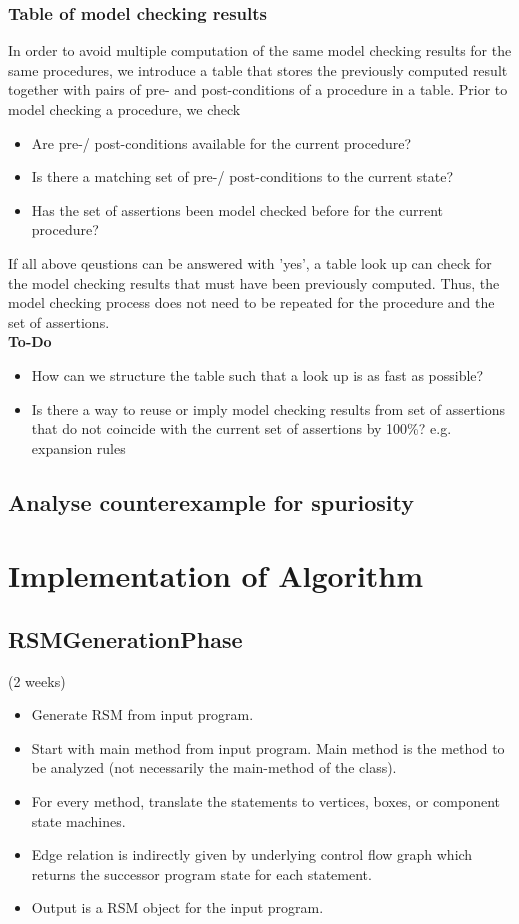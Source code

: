 \documentclass[a4paper,12pt]{article}
\begin{document}
\subsubsection{Table of model checking results}
In order to avoid multiple computation of the same model checking results for the same procedures, we introduce a table that stores the previously computed result together with pairs of pre- and post-conditions of a procedure in a table. Prior to model checking a procedure, we check
\begin{itemize}
	\item Are pre-/ post-conditions available for the current procedure?
	\item Is there a matching set of pre-/ post-conditions to the current state?
	\item Has the set of assertions been model checked before for the current procedure?
\end{itemize}
If all above qeustions can be answered with 'yes', a table look up can check for the model checking results that must have been previously computed. Thus, the model checking process does not need to be repeated for the procedure and the set of assertions.\\

\textbf{To-Do} 
\begin{itemize}
	\item How can we structure the table such that a look up is as fast as possible?
	\item Is there a way to reuse or imply model checking results from set of assertions that do not coincide with the current set of assertions by 100\%? e.g. expansion rules 
\end{itemize}

\subsection{Analyse counterexample for spuriosity}

\section{Implementation of Algorithm}

\subsection{RSMGenerationPhase}
(2 weeks)
\begin{itemize}
	\item Generate RSM from input program.
	\item Start with main method from input program. Main method is the method to be analyzed (not necessarily the main-method of the class). 
	\item For every method, translate the statements to vertices, boxes, or component state machines. 
	\item Edge relation is indirectly given by underlying control flow graph which returns the successor program state for each statement.
	\item Output is a RSM object for the input program.
\end{itemize}
\end{document}
